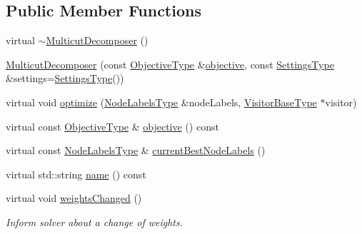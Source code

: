 \subsection*{Public Member Functions}
\begin{DoxyCompactItemize}
\item 
virtual \hyperlink{classnifty_1_1graph_1_1opt_1_1multicut_1_1MulticutDecomposer_a8d2e381e68e3c0b9d91a57b05d8dfcc8}{$\sim$\+Multicut\+Decomposer} ()
\item 
\hyperlink{classnifty_1_1graph_1_1opt_1_1multicut_1_1MulticutDecomposer_ac2f107b3f00f443f0154a2eceb1b7489}{Multicut\+Decomposer} (const \hyperlink{classnifty_1_1graph_1_1opt_1_1multicut_1_1MulticutDecomposer_ab70024cf8bdd7baea7842c33de022ffd}{Objective\+Type} \&\hyperlink{classnifty_1_1graph_1_1opt_1_1multicut_1_1MulticutDecomposer_aa42822243117e0823b699d27d7b87876}{objective}, const \hyperlink{structnifty_1_1graph_1_1opt_1_1multicut_1_1MulticutDecomposer_1_1SettingsType}{Settings\+Type} \&settings=\hyperlink{structnifty_1_1graph_1_1opt_1_1multicut_1_1MulticutDecomposer_1_1SettingsType}{Settings\+Type}())
\item 
virtual void \hyperlink{classnifty_1_1graph_1_1opt_1_1multicut_1_1MulticutDecomposer_a3af3a6e0f7fb204b4248e0acc4d73548}{optimize} (\hyperlink{classnifty_1_1graph_1_1opt_1_1multicut_1_1MulticutDecomposer_a69684cd6ab2be276e72622e0fdedca33}{Node\+Labels\+Type} \&node\+Labels, \hyperlink{classnifty_1_1graph_1_1opt_1_1multicut_1_1MulticutDecomposer_aa922f216a5bf815efc8b3926d417ef67}{Visitor\+Base\+Type} $\ast$visitor)
\item 
virtual const \hyperlink{classnifty_1_1graph_1_1opt_1_1multicut_1_1MulticutDecomposer_ab70024cf8bdd7baea7842c33de022ffd}{Objective\+Type} \& \hyperlink{classnifty_1_1graph_1_1opt_1_1multicut_1_1MulticutDecomposer_aa42822243117e0823b699d27d7b87876}{objective} () const
\item 
virtual const \hyperlink{classnifty_1_1graph_1_1opt_1_1multicut_1_1MulticutDecomposer_a69684cd6ab2be276e72622e0fdedca33}{Node\+Labels\+Type} \& \hyperlink{classnifty_1_1graph_1_1opt_1_1multicut_1_1MulticutDecomposer_a75b45d5d59b9c498237ef28581bbf8d8}{current\+Best\+Node\+Labels} ()
\item 
virtual std\+::string \hyperlink{classnifty_1_1graph_1_1opt_1_1multicut_1_1MulticutDecomposer_aa079d79e3821334c45c26e5fdeb41c38}{name} () const
\item 
virtual void \hyperlink{classnifty_1_1graph_1_1opt_1_1multicut_1_1MulticutDecomposer_a084c96012a6e513417b08f9e4242f6f7}{weights\+Changed} ()
\begin{DoxyCompactList}\small\item\em Inform solver about a change of weights. \end{DoxyCompactList}\end{DoxyCompactItemize}


